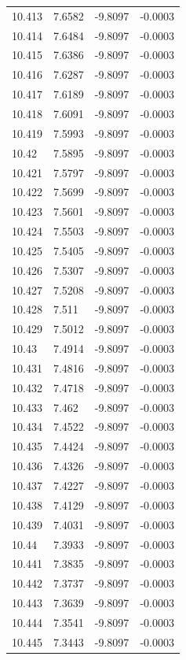 \begin{tabular}{llll}
10.413 & 7.6582 & -9.8097 & -0.0003 \\
10.414 & 7.6484 & -9.8097 & -0.0003 \\
10.415 & 7.6386 & -9.8097 & -0.0003 \\
10.416 & 7.6287 & -9.8097 & -0.0003 \\
10.417 & 7.6189 & -9.8097 & -0.0003 \\
10.418 & 7.6091 & -9.8097 & -0.0003 \\
10.419 & 7.5993 & -9.8097 & -0.0003 \\
10.42 & 7.5895 & -9.8097 & -0.0003 \\
10.421 & 7.5797 & -9.8097 & -0.0003 \\
10.422 & 7.5699 & -9.8097 & -0.0003 \\
10.423 & 7.5601 & -9.8097 & -0.0003 \\
10.424 & 7.5503 & -9.8097 & -0.0003 \\
10.425 & 7.5405 & -9.8097 & -0.0003 \\
10.426 & 7.5307 & -9.8097 & -0.0003 \\
10.427 & 7.5208 & -9.8097 & -0.0003 \\
10.428 & 7.511 & -9.8097 & -0.0003 \\
10.429 & 7.5012 & -9.8097 & -0.0003 \\
10.43 & 7.4914 & -9.8097 & -0.0003 \\
10.431 & 7.4816 & -9.8097 & -0.0003 \\
10.432 & 7.4718 & -9.8097 & -0.0003 \\
10.433 & 7.462 & -9.8097 & -0.0003 \\
10.434 & 7.4522 & -9.8097 & -0.0003 \\
10.435 & 7.4424 & -9.8097 & -0.0003 \\
10.436 & 7.4326 & -9.8097 & -0.0003 \\
10.437 & 7.4227 & -9.8097 & -0.0003 \\
10.438 & 7.4129 & -9.8097 & -0.0003 \\
10.439 & 7.4031 & -9.8097 & -0.0003 \\
10.44 & 7.3933 & -9.8097 & -0.0003 \\
10.441 & 7.3835 & -9.8097 & -0.0003 \\
10.442 & 7.3737 & -9.8097 & -0.0003 \\
10.443 & 7.3639 & -9.8097 & -0.0003 \\
10.444 & 7.3541 & -9.8097 & -0.0003 \\
10.445 & 7.3443 & -9.8097 & -0.0003 \\

\end{tabular}
